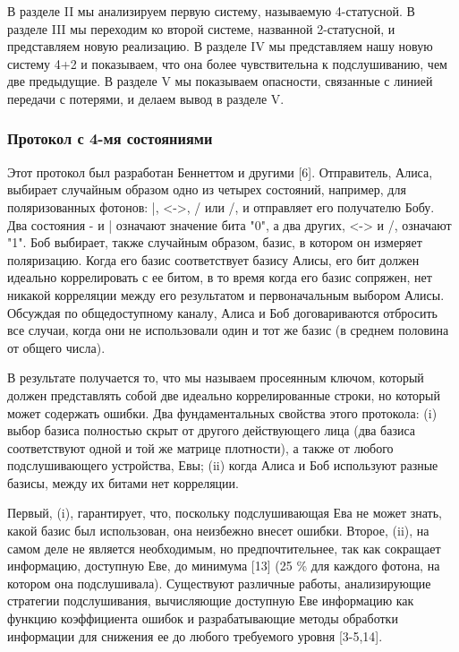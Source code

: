В разделе II мы анализируем первую систему, называемую 4-статусной. В разделе III мы переходим ко второй системе, названной 2-статусной, и представляем новую реализацию.
В разделе IV мы представляем нашу новую систему 4+2 и показываем, что она более чувствительна к подслушиванию, чем две предыдущие. В разделе V мы показываем опасности, связанные с линией передачи с потерями, и делаем вывод в разделе V.

\subsubsection{Протокол с 4-мя состояниями}

Этот протокол был разработан Беннеттом и другими [6]. Отправитель, Алиса, выбирает случайным образом одно из четырех состояний, например, для поляризованных фотонов: |, <->, / или /, и отправляет его получателю Бобу. Два состояния - и | означают значение бита "0", а два других, <-> и /, означают "1". Боб выбирает, также случайным образом, базис, в котором он измеряет поляризацию. Когда его базис соответствует базису Алисы, его бит должен идеально коррелировать с ее битом, в то время когда его базис сопряжен, нет никакой корреляции между его результатом и первоначальным выбором Алисы. Обсуждая по общедоступному каналу, Алиса и Боб договариваются отбросить все случаи, когда они не использовали один и тот же базис (в среднем половина от общего числа).

В результате получается то, что мы называем просеянным ключом, который должен представлять собой две идеально коррелированные строки, но который может содержать ошибки. Два фундаментальных свойства этого протокола: (i) выбор базиса полностью скрыт от другого действующего лица (два базиса соответствуют одной и той же матрице плотности), а также от любого подслушивающего устройства, Евы; (ii) когда Алиса и Боб используют разные базисы, между их битами нет корреляции.

Первый, (i), гарантирует, что, поскольку подслушивающая Ева не может знать, какой базис был использован, она неизбежно внесет ошибки. Второе, (ii), на самом деле не является необходимым, но предпочтительнее, так как сокращает информацию, доступную Еве, до минимума [13] (25 \% для каждого фотона, на котором она подслушивала). Существуют различные работы, анализирующие стратегии подслушивания, вычисляющие доступную Еве информацию как функцию коэффициента ошибок и разрабатывающие методы обработки информации для снижения ее до любого требуемого уровня [3-5,14].

